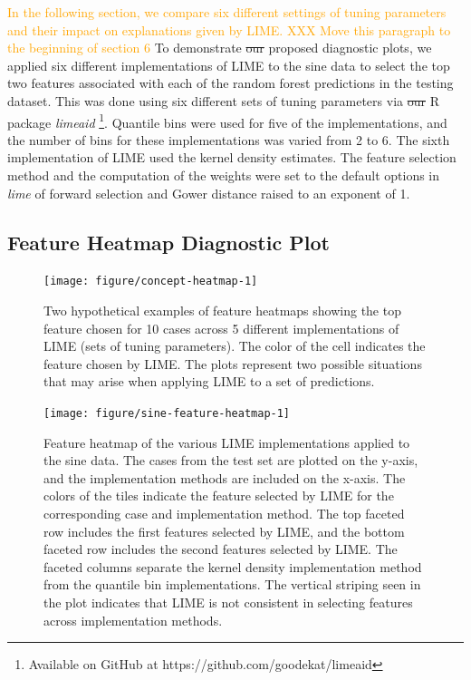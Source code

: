 \documentclass[AMS,STIX2COL]{WileyNJD-v2}\usepackage[]{graphicx}\usepackage[]{color}
\newenvironment{knitrout}{}{} %
\newcommand{\hh}[1]{\textcolor{orange}{#1}}
\newcommand{\data}{sine data}
\begin{document}
{\hh{In the following section, we compare six different settings of tuning parameters and their impact on explanations given by LIME.}
\hh{XXX Move this paragraph to the beginning of section 6}
To demonstrate \sout{our} proposed diagnostic plots, we applied six different implementations of LIME to the sine data to select the top two features associated with each of the random forest predictions in the testing dataset. This was done using six different sets of tuning parameters via \sout{our} R package \emph{limeaid} \footnote{Available on GitHub at https://github.com/goodekat/limeaid}. Quantile bins were used for five of the implementations, and the number of bins for these implementations was varied from 2 to 6. The sixth implementation of LIME used the kernel density estimates. The feature selection method and the computation of the weights were set to the default options in \emph{lime} of forward selection and Gower distance raised to an exponent of 1.

\subsection{Feature Heatmap Diagnostic Plot} \label{feature-heatmap}

\begin{figure}[!b]
\begin{knitrout}
\color{fgcolor}
\texttt{[image: figure/concept-heatmap-1]} 

\end{knitrout}
\caption{Two hypothetical examples of feature heatmaps showing the top feature chosen for 10 cases across 5 different implementations of LIME (sets of tuning parameters). The color of the cell indicates the feature chosen by LIME. The plots represent two possible situations that may arise when applying LIME to a set of predictions.}
\label{fig:concept-heatmap}
\end{figure}

\begin{figure}[!t]
\begin{knitrout}
\color{fgcolor}
\texttt{[image: figure/sine-feature-heatmap-1]} 

\end{knitrout}
\caption{Feature heatmap of the various LIME implementations applied to the \data. The cases from the test set are plotted on the y-axis, and the implementation methods are included on the x-axis. The colors of the tiles indicate the feature selected by LIME for the corresponding case and implementation method. The top faceted row includes the first features selected by LIME, and the bottom faceted row includes the second features selected by LIME. The faceted columns separate the kernel density implementation method from the quantile bin implementations. The vertical striping seen in the plot indicates that LIME is not consistent in selecting features across implementation methods.}
\label{fig:sine-feature-heatmap}
\end{figure}

}
\end{document}
